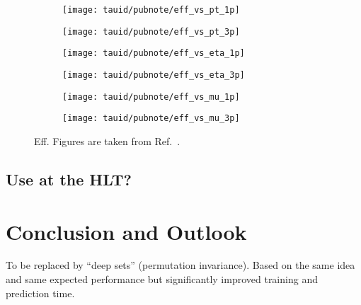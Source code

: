 \begin{figure}[htbp]

  \begin{subfigure}{0.498\textwidth}
    \texttt{[image: tauid/pubnote/eff\_vs\_pt\_1p]}
    \subcaption{}
  \end{subfigure}\hfill%
  \begin{subfigure}{0.498\textwidth}
    \texttt{[image: tauid/pubnote/eff\_vs\_pt\_3p]}
    \subcaption{}
  \end{subfigure}

  \begin{subfigure}{0.498\textwidth}
    \texttt{[image: tauid/pubnote/eff\_vs\_eta\_1p]}
    \subcaption{}
  \end{subfigure}\hfill%
  \begin{subfigure}{0.498\textwidth}
    \texttt{[image: tauid/pubnote/eff\_vs\_eta\_3p]}
    \subcaption{}
  \end{subfigure}

  \begin{subfigure}{0.498\textwidth}
    \texttt{[image: tauid/pubnote/eff\_vs\_mu\_1p]}
    \subcaption{}
  \end{subfigure}\hfill%
  \begin{subfigure}{0.498\textwidth}
    \texttt{[image: tauid/pubnote/eff\_vs\_mu\_3p]}
    \subcaption{}
  \end{subfigure}

  \caption{Eff. Figures are taken from
    Ref.~\cite{ATL-PHYS-PUB-2019-033}.}
  \label{fig:tauid_truetau_eff}
\end{figure}





\subsection{Use at the HLT?}

\cite{ATL-DAQ-PUB-2019-001}


\section{Conclusion and Outlook}
\label{sec:tauid_conclusion}


To be replaced by ``deep sets'' (permutation invariance). Based on the
same idea and same expected performance but significantly improved
training and prediction time.

